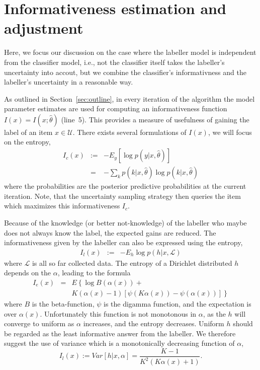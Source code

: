 \documentclass[10pt, onecolumn]{article}
\newcommand{\U}{\mathcal{U}}
\renewcommand{\L}{\mathcal{L}}
\begin{document}
\section{Informativeness estimation and adjustment}
\label{sec:adjustment}

Here, we focus our discussion on the case where the labeller model is
independent from the classifier model, i.e., not the classifier itself
takes the labeller's uncertainty into accout, but we combine the
classifier's informativness and the labeller's uncertainty in a
reasonable way.

As outlined in Section~\ref{sec:outline}, in every iteration of the
algorithm the model parameter estimates are used for computing an
informativeness function $I(x)=I(x;\hat\theta)$ (line~5). This
provides a measure of usefulness of gaining the label of an item $x\in
\U$. There exists several formulations of $I(x)$, we will focus on the
entropy,
\begin{eqnarray}
I_c(x)&:=&-E_y [\log p(y|x,\hat\theta)]\\ 
&=&-\sum_k p(k|x,\hat\theta)\log p(k|x,\hat\theta)
\end{eqnarray}
where the probabilities are the posterior predictive probabilities at
the current iteration. Note, that the uncertainty sampling strategy
then queries the item which maximizes this informativeness $I_c$.

Because of the knowledge (or better not-knowledge) of the labeller who
maybe does not always know the label, the expected gains are reduced.
The informativeness given by the labeller can also be expressed using
the entropy,
\begin{eqnarray}
I_l(x)&:=& -E_h \log p(h|x, \L)
\end{eqnarray}
where $\L$ is all so far collected data. The entropy of a Dirichlet
distributed $h$ depends on the $\alpha$, leading to the formula
\begin{eqnarray}
I_e(x)&=& E\left\{ \log B(\alpha(x)) + \right. \\
& &\left. K(\alpha(x)-1)[\psi(K\alpha(x))-\psi(\alpha(x))] \right\}\nonumber
\end{eqnarray}
where $B$ is the beta-function, $\psi$ is the digamma function, and
the expectation is over $\alpha(x)$. Unfortunately this function is
not monotonous in $\alpha$, as the $h$ will converge to uniform as
$\alpha$ increases, and the entropy decreases. Uniform $h$ should be
regarded as the least informative answer from the labeller. We
therefore suggest the use of variance which is a monotonically
decreasing function of $\alpha$,
\[
I_l(x):= Var [h|x, \alpha] = \frac{K-1}{K^2(K\alpha(x)+1)}.
\] 
\end{document}

